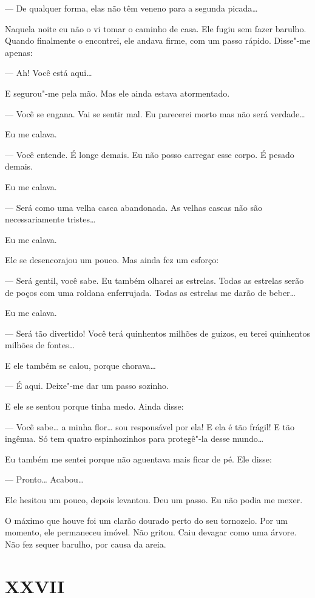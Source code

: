 \begin{Parallel}[p]{}{}
{--- De qualquer forma, elas não têm veneno para a segunda picada\ldots{}

Naquela noite eu não o vi tomar o caminho de casa. Ele fugiu sem fazer
barulho. Quando finalmente o encontrei, ele andava firme, com um passo
rápido. Disse"-me apenas:

--- Ah! Você está aqui\ldots{}

E segurou"-me pela mão. Mas ele ainda estava atormentado.

--- Você se engana. Vai se sentir mal. Eu parecerei morto mas não será
verdade\ldots{}

Eu me calava.

--- Você entende. É longe demais. Eu não posso carregar esse corpo. É
pesado demais.

Eu me calava.

--- Será como uma velha casca abandonada. As velhas cascas não são
necessariamente tristes\ldots{}

Eu me calava.

Ele se desencorajou um pouco. Mas ainda fez um esforço:

--- Será gentil, você sabe. Eu também olharei as estrelas. Todas as
estrelas serão de poços com uma roldana enferrujada. Todas as estrelas
me darão de beber\ldots{}

Eu me calava.

--- Será tão divertido! Você terá quinhentos milhões de guizos, eu terei
quinhentos milhões de fontes\ldots{}

E ele também se calou, porque chorava\ldots{}

--- É aqui. Deixe"-me dar um passo sozinho.

E ele se sentou porque tinha medo. Ainda disse:

--- Você sabe\ldots{} a minha flor\ldots{} sou responsável por ela! E ela é tão
frágil! E tão ingênua. Só tem quatro espinhozinhos para protegê"-la desse
mundo\ldots{}

Eu também me sentei porque não aguentava mais ficar de pé. Ele disse:

--- Pronto\ldots{} Acabou\ldots{}

Ele hesitou um pouco, depois levantou. Deu um passo. Eu não podia me
mexer.

O máximo que houve foi um clarão dourado perto do seu tornozelo. Por um
momento, ele permaneceu imóvel. Não gritou. Caiu devagar como uma
árvore. Não fez sequer barulho, por causa da areia.

\section{XXVII}

}
\end{Parallel}
